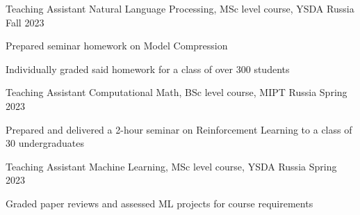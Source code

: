 
\begin{cventries}
  \cventry
    {Teaching Assistant} %
    {Natural Language Processing, MSc level course, YSDA} %
    {Russia} %
    {Fall 2023} %
    {
      \begin{cvitems} %
        \item {Prepared seminar homework on Model Compression}
        \item {Individually graded said homework for a class of over 300 students}
      \end{cvitems}
    }

    \cventry
    {Teaching Assistant} %
    {Computational Math, BSc level course, MIPT} %
    {Russia} %
    {Spring 2023} %
    {
      \begin{cvitems} %
        \item {Prepared and delivered a 2-hour seminar on Reinforcement Learning to a class of 30 undergraduates}
      \end{cvitems}
    }

  \cventry
    {Teaching Assistant} %
    {Machine Learning, MSc level course, YSDA} %
    {Russia} %
    {Spring 2023} %
    {
      \begin{cvitems} %
        \item {Graded paper reviews and assessed ML projects for course requirements}
      \end{cvitems}
    }
    
\end{cventries}
